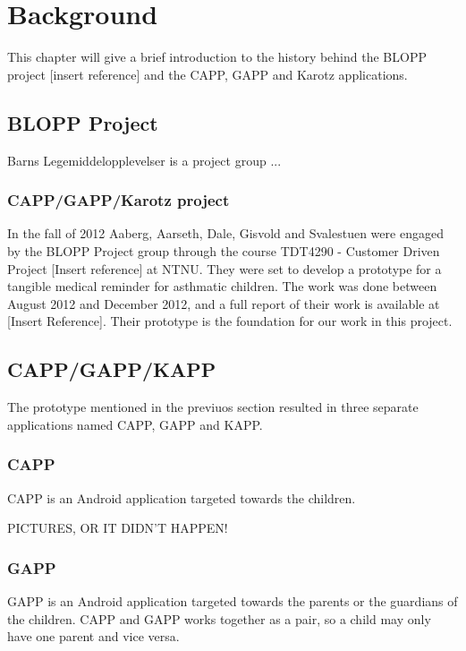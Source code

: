\chapter{Background}
\label{background}


This chapter will give a brief introduction to the history behind the BLOPP project [insert reference] and the CAPP, GAPP and Karotz applications.


\section{BLOPP Project}
Barns Legemiddelopplevelser is a project group ...

\subsection{CAPP/GAPP/Karotz project}
In the fall of 2012 Aaberg, Aarseth, Dale, Gisvold and Svalestuen were engaged by the BLOPP Project group through the course TDT4290 - Customer Driven Project [Insert reference] at NTNU. They were set to develop a prototype for a tangible medical reminder for asthmatic children. The work was done between August 2012 and December 2012, and a full report of their work is available at [Insert Reference]. 
Their prototype is the foundation for our work in this project.


\section{CAPP/GAPP/KAPP}
The prototype mentioned in the previuos section resulted in three separate applications named CAPP, GAPP and KAPP. 

\subsection{CAPP}
CAPP is an Android application targeted towards the children.  

PICTURES, OR IT DIDN'T HAPPEN!

\subsection{GAPP}
GAPP is an Android application targeted towards the parents or the guardians of the children. CAPP and GAPP works together as a pair, so a child may only have one parent and vice versa.


